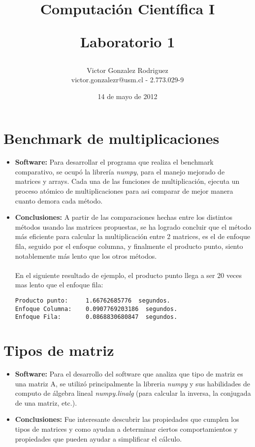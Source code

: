 \documentclass[12pt,letterpaper]{article}
\begin{document}
\title{Computaci\'on Científica I \\ \begin{Large}Laboratorio 1\end{Large}} 
\author{Victor Gonzalez Rodriguez\\victor.gonzalezr@usm.cl - 2.773.029-9}
\date{14 de mayo de 2012}
\maketitle


\section{Benchmark de multiplicaciones}
\begin{itemize}
\item \textbf{Software:} Para desarrollar el programa que realiza el benchmark comparativo, se ocupó la librería \textit{numpy}, para el manejo mejorado de matrices y arrays. Cada una de las funciones de multiplicación, ejecuta un proceso atómico de multiplicaciones para asi comparar de mejor manera cuanto demora cada método.
\item \textbf{Conclusiones:} A partir de las comparaciones hechas entre los distintos métodos usando las matrices propuestas, se ha logrado concluir que el método más eficiente para calcular la multiplicación entre 2 matrices, es el de enfoque fila, seguido por el enfoque columna, y finalmente el producto punto, siento notablemente más lento que los otros métodos.\\\\
En el siguiente resultado de ejemplo, el producto punto llega a ser 20 veces mas lento que el enfoque fila:
\begin{verbatim}
Producto punto:		1.66762685776  segundos.
Enfoque Columna:	0.0907769203186  segundos.
Enfoque Fila:		0.0868830680847  segundos.
\end{verbatim}
\end{itemize}

\section{Tipos de matriz}
\begin{itemize}
\item \textbf{Software:} Para el desarrollo del software que analiza que tipo de matriz es una matriz A, se utilizó principalmente la libreria \textit{numpy} y sus habilidades de computo de álgebra lineal \textit{numpy.linalg} (para calcular la inversa, la conjugada de una matriz, etc.).
\item \textbf{Conclusiones:} Fue interesante descubrir las propiedades que cumplen los tipos de matrices y como ayudan a determinar ciertos comportamientos y propiedades que pueden ayudar a simplificar el cálculo.
\end{itemize}
\end{document}
